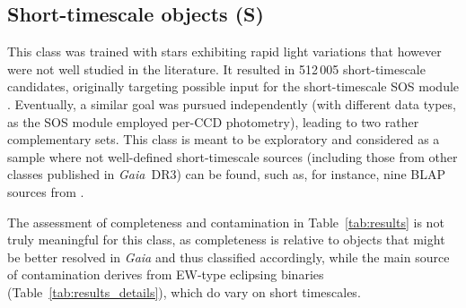 \documentclass[longauth]{aa}
\def\gaia{\textit{Gaia}\xspace}
\def\gdr3{\textit{Gaia}~DR3\xspace}
\begin{document}
\subsection{Short-timescale objects (S)\label{ssec:s}}

This class was trained with stars exhibiting rapid light variations that however were not well studied in the literature. It resulted in 512\,005 short-timescale candidates, originally targeting possible input for the short-timescale SOS module \citep[described in sect.~10.12 of the \gdr3 documentation;][]{2022gdr3.reptE..10R}. Eventually, a similar goal was pursued independently (with different  data types, as the SOS module employed per-CCD photometry), leading to two rather complementary sets. 
This class is meant to be exploratory and considered as a sample where not well-defined short-timescale sources (including those from other classes published in \gdr3) can be found, such as, for instance, nine BLAP sources from \citet{2017NatAs...1E.166P}. 

The assessment of completeness and contamination in Table~\ref{tab:results} is not truly meaningful for this class, as completeness is relative to objects that might be better resolved in \gaia and thus classified accordingly, while the main source of contamination derives from EW-type eclipsing binaries (Table~\ref{tab:results_details}), which do vary on short timescales. 
\end{document}
